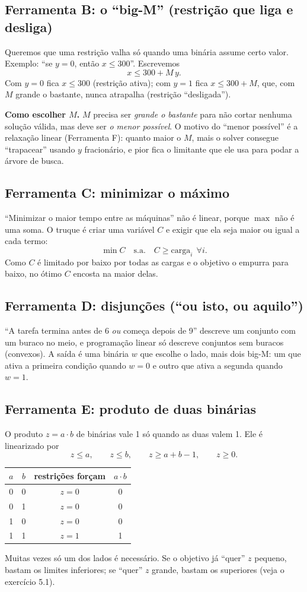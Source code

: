 \documentclass[11pt,a4paper]{article}
\begin{document}
\subsection*{Ferramenta B: o ``big-M'' (restrição que liga e desliga)}
Queremos que uma restrição valha só quando uma binária assume certo valor. Exemplo:
``se $y=0$, então $x\le 300$''. Escrevemos
\[
  x \le 300 + M\,y .
\]
Com $y=0$ fica $x\le 300$ (restrição ativa); com $y=1$ fica $x\le 300+M$, que, com $M$ grande o
bastante, nunca atrapalha (restrição ``desligada'').

\textbf{Como escolher $M$.} $M$ precisa ser \emph{grande o bastante} para não cortar nenhuma solução
válida, mas deve ser \emph{o menor possível}. O motivo do ``menor possível'' é a relaxação linear (Ferramenta F):
quanto maior o $M$, mais o solver consegue ``trapacear'' usando $y$ fracionário, e pior fica o limitante que ele
usa para podar a árvore de busca.

\subsection*{Ferramenta C: minimizar o máximo}
``Minimizar o maior tempo entre as máquinas'' não é linear, porque $\max$ não é uma soma. O truque é criar
uma variável $C$ e exigir que ela seja maior ou igual a cada termo:
\[
  \min C \quad\text{s.a.}\quad C \ge \text{carga}_i\ \ \forall i .
\]
Como $C$ é limitado por baixo por todas as cargas e o objetivo o empurra para baixo, no ótimo $C$ encosta
na maior delas.

\subsection*{Ferramenta D: disjunções (``ou isto, ou aquilo'')}
``A tarefa termina antes de 6 \emph{ou} começa depois de 9'' descreve um conjunto com um buraco no
meio, e programação linear só descreve conjuntos sem buracos (convexos). A saída é uma binária $w$ que
escolhe o lado, mais dois big-M: um que ativa a primeira condição quando $w=0$ e outro que ativa a segunda
quando $w=1$.

\subsection*{Ferramenta E: produto de duas binárias}
O produto $z=a\cdot b$ de binárias vale 1 só quando as duas valem 1. Ele é linearizado por
\[
  z \le a,\qquad z \le b,\qquad z \ge a+b-1,\qquad z\ge 0 .
\]
\begin{center}
\begin{tabular}{cccc}
\toprule
$a$ & $b$ & restrições forçam & $a\cdot b$\\
\midrule
0 & 0 & $z=0$ & 0\\
0 & 1 & $z=0$ & 0\\
1 & 0 & $z=0$ & 0\\
1 & 1 & $z=1$ & 1\\
\bottomrule
\end{tabular}
\end{center}
Muitas vezes só um dos lados é necessário. Se o objetivo já ``quer'' $z$ pequeno, bastam os limites
inferiores; se ``quer'' $z$ grande, bastam os superiores (veja o exercício 5.1).
\end{document}
